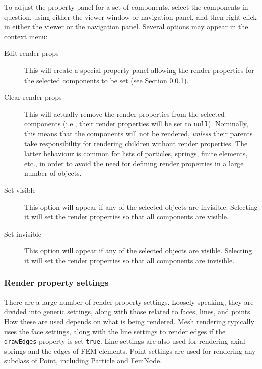 \documentclass{article}
\begin{document}
To adjust the property panel for a set of components, select the components
in question, using either the viewer window or navigation panel, and then right 
click in either the viewer or the navigation panel. Several options may appear
in the context menu:

\begin{description}

\item[Edit render props]\mbox{}

This will create a special property panel allowing the render properties for
the selected components to be set (see Section \ref{renderPropSettingsSec}).

\item[Clear render props]\mbox{}

This will actually remove the render properties
from the selected components (i.e., their render properties will be
set to {\tt null}).  Nominally, this means that the components will not be
rendered, {\it unless} their parents take responsibility for rendering
children without render properties. The latter behaviour is common for
lists of particles, springs, finite elements, etc., in order to
avoid the need for defining render properties in a large number
of objects.

\item[Set visible]\mbox{}

This option will appear if any of the selected objects are
invisible. Selecting it will set the render properties so
that all components are visible.

\item[Set invisible]\mbox{}

This option will appear if any of the selected objects are
visible. Selecting it will set the render properties so
that all components are invisible.

\end{description}

\subsubsection{Render property settings}
\label{renderPropSettingsSec}

There are a large number of render property settings. Loosely
speaking, they are divided into generic settings, along with those
related to faces, lines, and points. How these are used depends on
what is being rendered. Mesh rendering typically uses the face
settings, along with the line settings to render edges if the
{\tt drawEdges} property is set {\tt true}.  Line settings are also used for
rendering axial springs and the edges of FEM elements.  Point settings
are used for rendering any subclass of Point, including Particle and
FemNode. 
\end{document}
